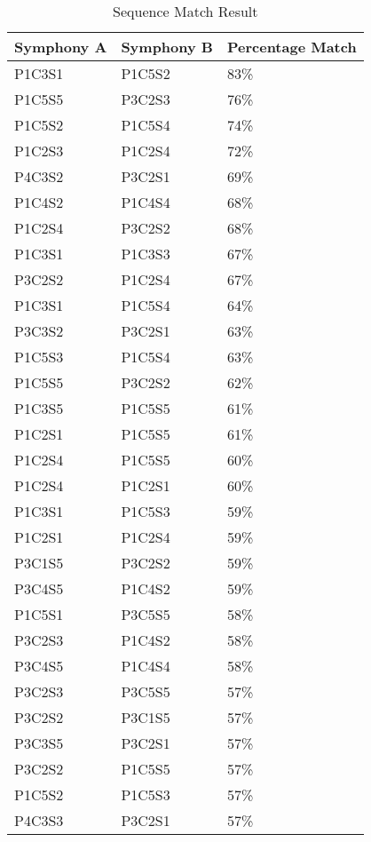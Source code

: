 \begin{longtable}{|l|l|l|}
\caption{Sequence Match Result}
\label{my-label}\\
\hline
Symphony A & Symphony B & Percentage Match \\ \hline
\endfirsthead
%
\endhead
%
P1C3S1 & P1C5S2 & 83\% \\ \hline
P1C5S5 & P3C2S3 & 76\% \\ \hline
P1C5S2 & P1C5S4 & 74\% \\ \hline
P1C2S3 & P1C2S4 & 72\% \\ \hline
P4C3S2 & P3C2S1 & 69\% \\ \hline
P1C4S2 & P1C4S4 & 68\% \\ \hline
P1C2S4 & P3C2S2 & 68\% \\ \hline
P1C3S1 & P1C3S3 & 67\% \\ \hline
P3C2S2 & P1C2S4 & 67\% \\ \hline
P1C3S1 & P1C5S4 & 64\% \\ \hline
P3C3S2 & P3C2S1 & 63\% \\ \hline
P1C5S3 & P1C5S4 & 63\% \\ \hline
P1C5S5 & P3C2S2 & 62\% \\ \hline
P1C3S5 & P1C5S5 & 61\% \\ \hline
P1C2S1 & P1C5S5 & 61\% \\ \hline
P1C2S4 & P1C5S5 & 60\% \\ \hline
P1C2S4 & P1C2S1 & 60\% \\ \hline
P1C3S1 & P1C5S3 & 59\% \\ \hline
P1C2S1 & P1C2S4 & 59\% \\ \hline
P3C1S5 & P3C2S2 & 59\% \\ \hline
P3C4S5 & P1C4S2 & 59\% \\ \hline
P1C5S1 & P3C5S5 & 58\% \\ \hline
P3C2S3 & P1C4S2 & 58\% \\ \hline
P3C4S5 & P1C4S4 & 58\% \\ \hline
P3C2S3 & P3C5S5 & 57\% \\ \hline
P3C2S2 & P3C1S5 & 57\% \\ \hline
P3C3S5 & P3C2S1 & 57\% \\ \hline
P3C2S2 & P1C5S5 & 57\% \\ \hline
P1C5S2 & P1C5S3 & 57\% \\ \hline
P4C3S3 & P3C2S1 & 57\% \\ \hline
\end{longtable}

